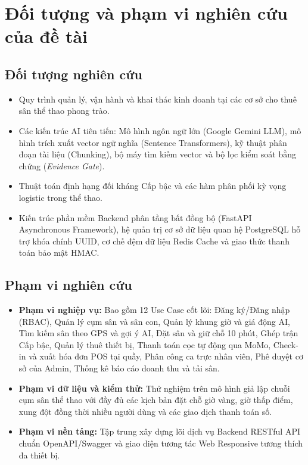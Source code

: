 \section{Đối tượng và phạm vi nghiên cứu của đề tài}
\label{sec:phamvi}

\subsection{Đối tượng nghiên cứu}
\begin{itemize}[leftmargin=1.5cm]
    \item Quy trình quản lý, vận hành và khai thác kinh doanh tại các cơ sở cho thuê sân thể thao phong trào.
    \item Các kiến trúc AI tiên tiến: Mô hình ngôn ngữ lớn (Google Gemini LLM), mô hình trích xuất vector ngữ nghĩa (Sentence Transformers), kỹ thuật phân đoạn tài liệu (Chunking), bộ máy tìm kiếm vector và bộ lọc kiểm soát bằng chứng (\textit{Evidence Gate}).
    \item Thuật toán định hạng đối kháng Cấp bậc và các hàm phân phối kỳ vọng logistic trong thể thao.
    \item Kiến trúc phần mềm Backend phân tầng bất đồng bộ (FastAPI Asynchronous Framework), hệ quản trị cơ sở dữ liệu quan hệ PostgreSQL hỗ trợ khóa chính UUID, cơ chế đệm dữ liệu Redis Cache và giao thức thanh toán bảo mật HMAC.
\end{itemize}

\subsection{Phạm vi nghiên cứu}
\begin{itemize}[leftmargin=1.5cm]
    \item \textbf{Phạm vi nghiệp vụ:} Bao gồm 12 Use Case cốt lõi: Đăng ký/Đăng nhập (RBAC), Quản lý cụm sân và sân con, Quản lý khung giờ và giá động AI, Tìm kiếm sân theo GPS và gợi ý AI, Đặt sân và giữ chỗ 10 phút, Ghép trận Cấp bậc, Quản lý thuê thiết bị, Thanh toán cọc tự động qua MoMo, Check-in và xuất hóa đơn POS tại quầy, Phân công ca trực nhân viên, Phê duyệt cơ sở của Admin, Thống kê báo cáo doanh thu và tải sân.
    \item \textbf{Phạm vi dữ liệu và kiểm thử:} Thử nghiệm trên mô hình giả lập chuỗi cụm sân thể thao với đầy đủ các kịch bản đặt chỗ giờ vàng, giờ thấp điểm, xung đột đồng thời nhiều người dùng và các giao dịch thanh toán số.
    \item \textbf{Phạm vi nền tảng:} Tập trung xây dựng lõi dịch vụ Backend RESTful API chuẩn OpenAPI/Swagger và giao diện tương tác Web Responsive tương thích đa thiết bị.
\end{itemize}

